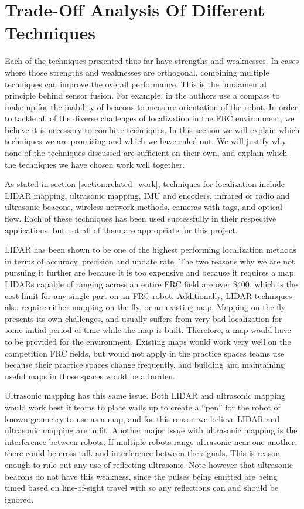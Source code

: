 \documentclass{article}
\begin{document}
\section{Trade-Off Analysis Of Different Techniques} \label{section:methods}

  Each of the techniques presented thus far have strengths and weaknesses. In cases where those strengths and weaknesses are orthogonal, combining multiple techniques can improve the overall performance. This is the fundamental principle behind sensor fusion. For example, in \cite{kim_advanced_2008} the authors use a compass to make up for the inability of beacons to measure orientation of the robot. In order to tackle all of the diverse challenges of localization in the FRC environment, we believe it is necessary to combine techniques. In this section we will explain which techniques we are promising and which we have ruled out. We will justify why none of the techniques discussed are sufficient on their own, and explain which the techniques we have chosen work well together.

  As stated in section \ref{section:related_work}, techniques for localization include LIDAR mapping, ultrasonic mapping, IMU and encoders, infrared or radio and ultrasonic beacons, wireless network methods, cameras with tags, and optical flow. Each of these techniques has been used successfully in their respective applications, but not all of them are appropriate for this project.

  LIDAR has been shown to be one of the highest performing localization methods in terms of accuracy, precision and update rate. The two reasons why we are not pursuing it further are because it is too expensive and because it requires a map. LIDARs capable of ranging across an entire FRC field are over \$400, which is the cost limit for any single part on an FRC robot. Additionally, LIDAR techniques also require either mapping on the fly, or an existing map. Mapping on the fly presents its own challenges, and usually suffers from very bad localization for some initial period of time while the map is built. Therefore, a map would have to be provided for the environment. Existing maps would work very well on the competition FRC fields, but would not apply in the practice spaces teams use because their practice spaces change frequently, and building and maintaining useful maps in those spaces would be a burden.

  Ultrasonic mapping has this same issue. Both LIDAR and ultrasonic mapping would work best if teams to place walls up to create a ``pen'' for the robot of known geometry to use as a map, and for this reason we believe LIDAR and ultrasonic mapping are unfit. Another major issue with ultrasonic mapping is the interference between robots. If multiple robots range ultrasonic near one another, there could be cross talk and interference between the signals. This is reason enough to rule out any use of reflecting ultrasonic. Note however that ultrasonic beacons do not have this weakness, since the pulses being emitted are being timed based on line-of-sight travel with so any reflections can and should be ignored.
\end{document}
